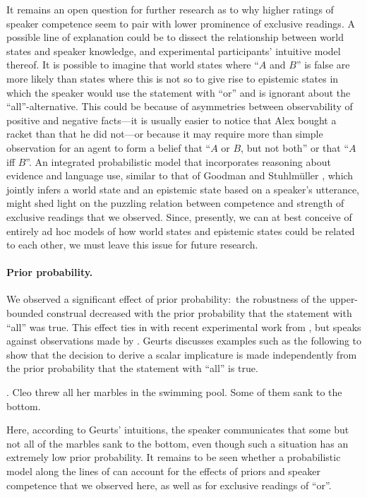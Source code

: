 \documentclass[12pt]{article}
\begin{document}
It remains an open question for further research as to why higher ratings of speaker competence
seem to pair with lower prominence of exclusive readings. A possible line of explanation could
be to dissect the relationship between world states and speaker knowledge, and experimental
participants' intuitive model thereof. It is possible to imagine that world states where ``$A$
and $B$'' is false are more likely than states where this is not so to give rise to epistemic
states in which the speaker would use the statement with ``or'' and is ignorant about the
``all''-alternative. This could be because of asymmetries between observability of positive and
negative facts---it is usually easier to notice that Alex bought a racket than that he did
not---or because it may require more than simple observation for an agent to form a belief that
``$A$ or $B$, but not both'' or that ``$A$ iff $B$''. An integrated probabilistic model that
incorporates reasoning about evidence and language use, similar to that of Goodman and
Stuhlm\"{u}ller \citeyearpar{goodman2013}, which jointly infers a world state and an epistemic
state based on a speaker's utterance, might shed light on the puzzling relation between
competence and strength of exclusive readings that we observed. Since, presently, we can at
best conceive of entirely ad hoc models of how world states and epistemic states could be
related to each other, we must leave this issue for future research.

\paragraph{Prior probability.} We observed a significant effect of prior probability:\ the
robustness of the upper-bounded construal decreased with the prior probability that the
statement with ``all'' was true. This effect ties in with recent experimental work from
\citet{degen2015}, but speaks against observations made by \citet{geurts2010}. Geurts discusses
examples such as the following to show that the decision to derive a scalar implicature is made
independently from the prior probability that the statement with ``all'' is true.

\ex.	Cleo threw all her marbles in the swimming pool. Some of them sank to the bottom.

Here, according to Geurts' intuitions, the speaker communicates that some but not all of the
marbles sank to the bottom, even though such a situation has an extremely low prior
probability. It remains to be seen whether a probabilistic model along the lines of
\citet{degen2015} can account for the effects of priors and speaker competence that we observed
here, as well as for exclusive readings of ``or''.
\end{document}
